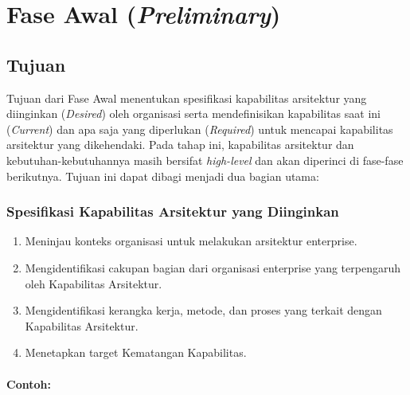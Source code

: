 \chapter{Fase Awal (\textit{Preliminary})}

\section{Tujuan}
Tujuan dari Fase Awal menentukan spesifikasi kapabilitas arsitektur yang diinginkan (\textit{Desired}) oleh organisasi serta mendefinisikan kapabilitas saat ini (\textit{Current}) dan apa saja yang diperlukan (\textit{Required}) untuk mencapai kapabilitas arsitektur yang dikehendaki. Pada tahap ini, kapabilitas arsitektur dan kebutuhan-kebutuhannya masih bersifat \textit{high-level} dan akan diperinci di fase-fase berikutnya. Tujuan ini dapat dibagi menjadi dua bagian utama:

\subsection{Spesifikasi Kapabilitas Arsitektur yang Diinginkan}
\begin{enumerate}
	\item Meninjau konteks organisasi untuk melakukan arsitektur enterprise.
	\item Mengidentifikasi cakupan bagian dari organisasi enterprise yang terpengaruh oleh Kapabilitas Arsitektur.
	\item Mengidentifikasi kerangka kerja, metode, dan proses yang terkait dengan Kapabilitas Arsitektur.
	\item Menetapkan target Kematangan Kapabilitas.
\end{enumerate}

\subsubsection{Contoh:}

